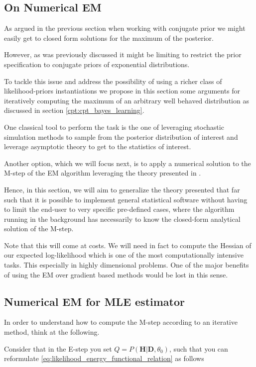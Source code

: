 \documentclass[11pt]{article}
\begin{document}
\begin{article}
\newpage

\section{On Numerical EM}
\label{numerical-em}
As argued in the previous section when working with conjugate prior
we might easily get to closed form solutions for the maximum of the
posterior.

However, as was previously discussed it might be limiting to
restrict the prior specification to conjugate priors of exponential
distributions.

To tackle this issue and address the possibility of using a richer
class of likelihood-priors instantiations we propose in this
section some arguments for iteratively computing the maximum of an
arbitrary well behaved distribution as discussed in section
\ref{cpt:cpt_bayes_learning}.

One classical tool to perform the task is the one of leveraging
stochastic simulation methods to sample from the posterior
distribution of interest and leverage asymptotic theory to get to
the statistics of interest.

Another option, which we will focus next, is to apply a numerical
solution to the M-step of the EM algorithm leveraging the theory
presented in \cite{ruud1989comparison}.

Hence, in this section, we will aim to generalize the theory
presented that far such that it is possible to implement general
statistical software without having to limit the end-user to very
specific pre-defined cases, where the algorithm running in the
background has necessarily to know the closed-form analytical
solution of the M-step.

Note that this will come at costs. We will need in fact to compute
the Hessian of our expected log-likelihood which is one of the most
computationally intensive tasks. This especially in highly
dimensional problems. One of the major benefits of using the EM over
gradient based methods would be lost in this sense.

\subsection{Numerical EM for MLE estimator}
\label{sec:org3a9e5cb}

In order to understand how to compute the M-step according to an
iterative method, think at the following.

Consider that in the E-step you set \(Q = P (\textbf{H}| \textbf{D}, \theta_0)\), such
that you can reformulate
\ref{eq:likelihood_energy_functional_relation} as follows


\end{article}
\end{document}
